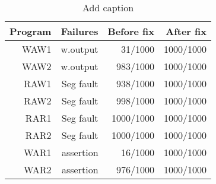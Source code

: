 \begin{table}[htbp]
  \centering
  \caption{Add caption}
    \begin{tabular}{rrrr}
    \toprule
    Program & Failures & Before fix & After fix \\
    \midrule
    WAW1 & w.output & 31/1000 & 1000/1000 \\
    WAW2 & w.output & 983/1000 & 1000/1000 \\
    RAW1 & Seg fault & 938/1000 & 1000/1000 \\
    RAW2 & Seg fault & 998/1000 & 1000/1000 \\
    RAR1 & Seg fault & 1000/1000 & 1000/1000 \\
    RAR2 & Seg fault & 1000/1000 & 1000/1000 \\
    WAR1 & assertion & 16/1000 & 1000/1000 \\
    WAR2 & assertion & 976/1000 & 1000/1000 \\
    \bottomrule
    \end{tabular}%
  \label{tab:addlabel}%
\end{table}%
